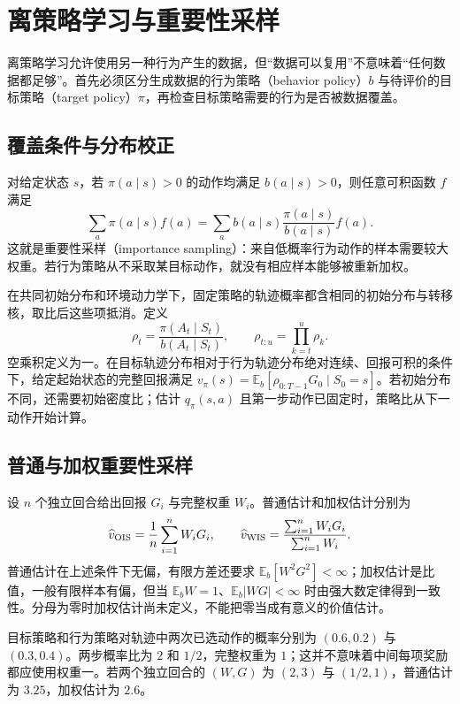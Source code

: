 \setcounter{chapter}{9} %
\chapter{离策略学习与重要性采样}
\label{ch:rl-offpolicy}

离策略学习允许使用另一种行为产生的数据，但“数据可以复用”不意味着“任何数据都足够”。首先必须区分生成数据的行为策略（behavior policy）$b$ 与待评价的目标策略（target policy）$\pi$，再检查目标策略需要的行为是否被数据覆盖。

\section{覆盖条件与分布校正}

对给定状态 $s$，若 $\pi(a\mid s)>0$ 的动作均满足 $b(a\mid s)>0$，则任意可积函数 $f$ 满足
\[
\sum_a\pi(a\mid s)f(a)=\sum_a b(a\mid s)\frac{\pi(a\mid s)}{b(a\mid s)}f(a).
\]
这就是重要性采样（importance sampling）：来自低概率行为动作的样本需要较大权重。若行为策略从不采取某目标动作，就没有相应样本能够被重新加权。

在共同初始分布和环境动力学下，固定策略的轨迹概率都含相同的初始分布与转移核，取比后这些项抵消。定义
\[
\rho_t=\frac{\pi(A_t\mid S_t)}{b(A_t\mid S_t)},\qquad
\rho_{t:u}=\prod_{k=t}^{u}\rho_k.
\]
空乘积定义为一。在目标轨迹分布相对于行为轨迹分布绝对连续、回报可积的条件下，给定起始状态的完整回报满足 $v_\pi(s)=\mathbb E_b[\rho_{0:T-1}G_0\mid S_0=s]$。若初始分布不同，还需要初始密度比；估计 $q_\pi(s,a)$ 且第一步动作已固定时，策略比从下一动作开始计算。

\section{普通与加权重要性采样}

设 $n$ 个独立回合给出回报 $G_i$ 与完整权重 $W_i$。普通估计和加权估计分别为
\[
\widehat v_{\rm OIS}=\frac1n\sum_{i=1}^nW_iG_i,\qquad
\widehat v_{\rm WIS}=\frac{\sum_{i=1}^nW_iG_i}{\sum_{i=1}^nW_i}.
\]
普通估计在上述条件下无偏，有限方差还要求 $\mathbb E_b[W^2G^2]<\infty$；加权估计是比值，一般有限样本有偏，但当 $\mathbb E_bW=1$、$\mathbb E_b|WG|<\infty$ 时由强大数定律得到一致性。分母为零时加权估计尚未定义，不能把零当成有意义的价值估计。

\begin{example}[概率比的乘积]
目标策略和行为策略对轨迹中两次已选动作的概率分别为 $(0.6,0.2)$ 与 $(0.3,0.4)$。两步概率比为 $2$ 和 $1/2$，完整权重为 $1$；这并不意味着中间每项奖励都应使用权重一。若两个独立回合的 $(W,G)$ 为 $(2,3)$ 与 $(1/2,1)$，普通估计为 $3.25$，加权估计为 $2.6$。
\end{example}

